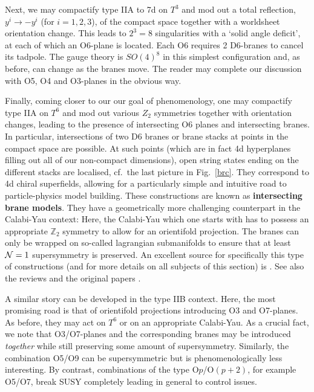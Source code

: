\documentclass[12pt]{article}
\numberwithin{equation}{section}
\begin{document}
Next, we may compactify type IIA to 7d on $T^3$ and mod out a total reflection, $y^i\to -y^i$ (for $i=1,2,3$), of the compact space together with a worldsheet orientation change. This leads to $2^3=8$ singularities with a `solid angle deficit', at each of which an O6-plane is located. Each O6 requires 2 D6-branes to cancel its tadpole. The gauge theory is $SO(4)^8$ in this simplest configuration and, as before, can change as the branes move. The reader may complete our discussion with O5, O4 and O3-planes in the obvious way.

Finally, coming closer to our our goal of phenomenology, one may  compactify type IIA on $T^6$ and mod out various $Z_2$ symmetries together with orientation changes, leading to the presence of intersecting O6 planes and intersecting branes. In particular, intersections of two D6 branes or brane stacks at points in the compact space are possible. At such points (which are in fact 4d hyperplanes filling out all of our non-compact dimensions), open string states ending on the different stacks are localised, cf.~the last picture in Fig.~\ref{brc}. They correspond to 4d chiral superfields, allowing for a particularly simple and intuitive road to particle-physics model building. These constructions are known as {\bf intersecting brane models}. They have a geometrically more challenging counterpart in the Calabi-Yau context: Here, the Calabi-Yau which one starts with has to possess an appropriate $\mathbb{Z}_2$ symmetry to allow for an orientifold projection. The branes can only be wrapped on so-called lagrangian submanifolds to ensure that at least ${\cal N}=1$ supersymmetry is preserved. An excellent source for specifically this type of constructions (and for more details on all subjects of this section) is \cite{Ibanez:2012zz}. See also the reviews \cite{Blumenhagen:2005mu, Blumenhagen:2006ci} and the original papers \cite{Ibanez:2001nd, Blumenhagen:2001te, Cvetic:2001nr, Gmeiner:2005vz}.

A similar story can be developed in the type IIB context.
Here, the most promising road is that of orientifold projections introducing O3 and O7-planes. As before, they may act on $T^6$ or on an appropriate Calabi-Yau. As a crucial fact, we note that O3/O7-planes and the corresponding branes may be introduced {\it together} while still preserving some amount of supersymmetry. Similarly, the combination O5/O9 can be supersymmetric but is phenomenologically less interesting. By contrast, combinations of the type O$p$/O$(p\!+\!2)$, for example O5/O7, break SUSY completely leading in general to control issues.
\end{document}
